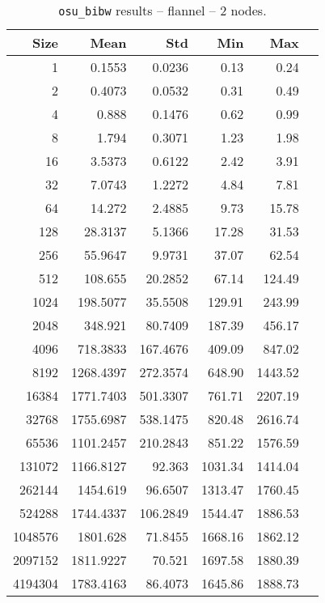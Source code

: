 \begin{table}[htbp]
\begin{minipage}{.48\textwidth}
  \label{tab:bibw-flannel-1nodes}
  \end{minipage}
\hfill
\begin{minipage}{.48\textwidth}
    \centering
    \footnotesize
  \begin{tabular}{rrrrrr}
	\toprule
	\textbf{Size} & \textbf{Mean} & \textbf{Std} & \textbf{Min} & \textbf{Max}	\\
	\midrule
	1	&	0.1553   	&	0.0236	&	0.13	&	0.24	\\
	2	&	0.4073   	&	0.0532	&	0.31	&	0.49	\\
	4	&	0.888   	&	0.1476	&	0.62	&	0.99	\\
	8	&	1.794   	&	0.3071	&	1.23	&	1.98	\\
	16	&	3.5373   	&	0.6122	&	2.42	&	3.91	\\
	32	&	7.0743   	&	1.2272	&	4.84	&	7.81	\\
	64	&	14.272   	&	2.4885	&	9.73	&	15.78	\\
	128	&	28.3137   	&	5.1366	&	17.28	&	31.53	\\
	256	&	55.9647   	&	9.9731	&	37.07	&	62.54	\\
	512	&	108.655   	&	20.2852	&	67.14	&	124.49	\\
	1024	&	198.5077   	&	35.5508	&	129.91	&	243.99	\\
	2048	&	348.921   	&	80.7409	&	187.39	&	456.17	\\
	4096	&	718.3833   	&	167.4676	&	409.09	&	847.02	\\
	8192	&	1268.4397   	&	272.3574	&	648.90	&	1443.52	\\
	16384	&	1771.7403   	&	501.3307	&	761.71	&	2207.19	\\
	32768	&	1755.6987   	&	538.1475	&	820.48	&	2616.74	\\
	65536	&	1101.2457   	&	210.2843	&	851.22	&	1576.59	\\
	131072	&	1166.8127   	&	92.363	&	1031.34	&	1414.04	\\
	262144	&	1454.619   	&	96.6507	&	1313.47	&	1760.45	\\
	524288	&	1744.4337   	&	106.2849	&	1544.47	&	1886.53	\\
	1048576	&	1801.628   	&	71.8455	&	1668.16	&	1862.12	\\
	2097152	&	1811.9227   	&	70.521	&	1697.58	&	1880.39	\\
	4194304	&	1783.4163   	&	86.4073	&	1645.86	&	1888.73	\\
	\bottomrule
	\end{tabular}
  \caption{\texttt{osu\_bibw} results -- flannel -- 2 nodes.}
  \label{tab:bibw-flannel-2nodes}
  \end{minipage}
\end{table}

